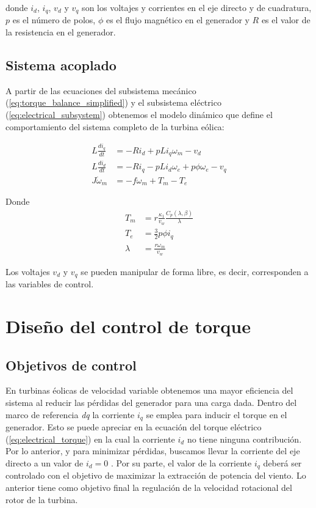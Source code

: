 {donde $i_d$, $i_q$, $v_d$ y $v_q$ son los voltajes y corrientes en el eje directo y de cuadratura, $p$ es el número de polos,
$\phi$ es el flujo magnético en el generador y $R$ es el valor de la resistencia en el generador. 

\subsection{Sistema acoplado}

A partir de las ecuaciones del subsistema mecánico (\ref{eq:torque_balance_simplified}) y el subsistema eléctrico (\ref{eq:electrical_subsystem}) 
obtenemos el modelo dinámico que define el comportamiento del sistema completo de la turbina eólica:

\begin{align}
    L\frac{di_q}{dt} &= -Ri_d + pLi_q\omega_m - v_d
    \\
    L\frac{di_d}{dt} &= -Ri_q - pLi_d\omega_e + p\phi\omega_e - v_q 
    \\
    J \dot{\omega}_m &= -f \omega_m + T_m - T_e
    \label{eq:full_system}
\end{align}

Donde
\begin{align}
    T_m &= r\frac{\kappa_1}{v_w} \frac{C_p(\lambda,\beta)}{\lambda}
    \\
    T_e &= \frac{3}{2}p\phi i_q
    \\
    \lambda &= \frac{r\omega_m}{v_w}
\end{align}

Los voltajes $v_d$ y $v_q$ se pueden manipular de forma libre, es decir, corresponden a las variables de control.

\section{Diseño del control de torque}

\subsection{Objetivos de control}

En turbinas éolicas de velocidad variable obtenemos una mayor eficiencia del sistema al reducir las pérdidas
del generador para una carga dada. Dentro del marco de referencia \emph{dq} la corriente $i_q$ se emplea para
inducir el torque en el generador. Esto se puede apreciar en la ecuación del torque eléctrico (\ref{eq:electrical_torque})
en la cual la corriente $i_d$ no tiene ninguna contribución. Por lo anterior, y para minimizar pérdidas, 
buscamos llevar la corriente del eje directo a un valor de $i_d = 0$ \cite{chinchilla2006}.
Por su parte, el valor de la corriente $i_q$ deberá ser controlado con el objetivo de maximizar la extracción 
de potencia del viento. Lo anterior tiene como objetivo final la regulación de la velocidad rotacional del 
rotor de la turbina. 
\\

}
